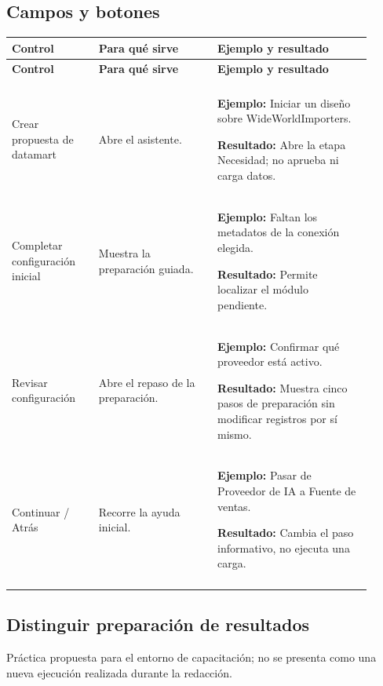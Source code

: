 \subsection{Campos y botones}
\begingroup
\fontsize{10}{12.5}\selectfont
\setlength{\tabcolsep}{5pt}
\renewcommand{\arraystretch}{1.15}
\begin{longtable}{@{}>{\RaggedRight\arraybackslash}p{0.22\linewidth}>{\RaggedRight\arraybackslash}p{0.3\linewidth}>{\RaggedRight\arraybackslash}p{0.39\linewidth}@{}}
\toprule
\textbf{Control} & \textbf{Para qué sirve} & \textbf{Ejemplo y resultado} \\
\midrule
\endfirsthead
\toprule
\textbf{Control} & \textbf{Para qué sirve} & \textbf{Ejemplo y resultado} \\
\midrule
\endhead
\midrule
\multicolumn{3}{r}{\footnotesize Continúa en la página siguiente}\\
\endfoot
\bottomrule
\endlastfoot
Crear propuesta de datamart & Abre el asistente. & \textbf{Ejemplo:} Iniciar un diseño sobre WideWorldImporters.\par\smallskip\textbf{Resultado:} Abre la etapa Necesidad; no aprueba ni carga datos. \\
\addlinespace[3pt]
Completar configuración inicial & Muestra la preparación guiada. & \textbf{Ejemplo:} Faltan los metadatos de la conexión elegida.\par\smallskip\textbf{Resultado:} Permite localizar el módulo pendiente. \\
\addlinespace[3pt]
Revisar configuración & Abre el repaso de la preparación. & \textbf{Ejemplo:} Confirmar qué proveedor está activo.\par\smallskip\textbf{Resultado:} Muestra cinco pasos de preparación sin modificar registros por sí mismo. \\
\addlinespace[3pt]
Continuar / Atrás & Recorre la ayuda inicial. & \textbf{Ejemplo:} Pasar de Proveedor de IA a Fuente de ventas.\par\smallskip\textbf{Resultado:} Cambia el paso informativo, no ejecuta una carga. \\
\addlinespace[3pt]
\end{longtable}
\endgroup

\subsection{Distinguir preparación de resultados}
Práctica propuesta para el entorno de capacitación; no se presenta como una nueva ejecución realizada durante la redacción.

